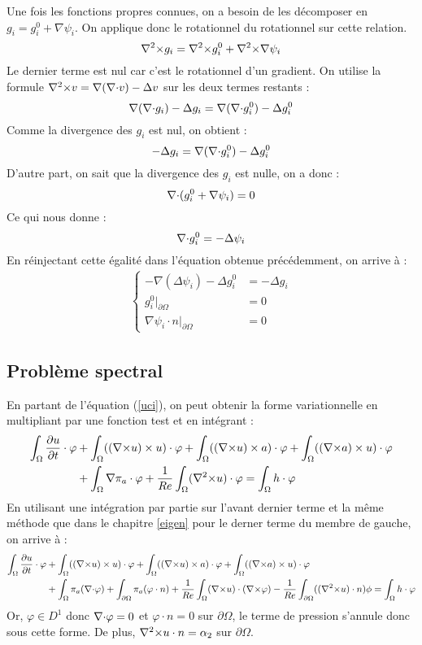 Une fois les fonctions propres connues, on a besoin de les décomposer en $g_i=g_i^0+\nabla\psi_i$. On applique donc le rotationnel du rotationnel sur cette relation.\\
\[
{\nabla^2\times} g_i = {\nabla^2\times} g_i^0 +{\nabla^2\times}\nabla\psi_i
\]
Le dernier terme est nul car c'est le rotationnel d'un gradient. On utilise la formule ${\nabla^2\times} v=\nabla({\nabla\cdot} v)-\Delta v$ sur les deux termes restants :
\[
\nabla({\nabla\cdot} g_i)-\Delta g_i = \nabla({\nabla\cdot} g_i^0)-\Delta g_i^0
\]
Comme la divergence des $g_i$ est nul, on obtient :
\[
-\Delta g_i = \nabla({\nabla\cdot} g_i^0)-\Delta g_i^0
\]
D'autre part, on sait que la divergence des $g_i$ est nulle, on a donc :
\[
{\nabla\cdot} (g_i^0+\nabla\psi_i)=0
\]
Ce qui nous donne :
\[
{\nabla\cdot} g_i^0=-\Delta\psi_i
\]
En réinjectant cette égalité dans l'équation obtenue précédemment, on arrive à :
\begin{eqnarray*}
\left\{
\begin{aligned}
-\nabla(\Delta\psi_i)-\Delta g_i^0 &= -\Delta g_i\\
g_i^0\big\rvert_{\partial\Omega} &= 0\\
\nabla\psi_i\cdot n\big\rvert_{\partial\Omega} &= 0
\end{aligned}
\right.
\end{eqnarray*}



\subsection{Problème spectral}
\label{spectre}

En partant de l'équation (\ref{uci}), on peut obtenir la forme variationnelle en multipliant par une fonction test et en intégrant :
\begin{align*}
\int_\Omega \frac{\partial u}{\partial t}\cdot \varphi &+ \int_\Omega (({\nabla\times} u)\times u)\cdot \varphi + \int_\Omega (({\nabla\times} u)\times a)\cdot\varphi + \int_\Omega (({\nabla\times} a)\times u)\cdot\varphi \\
&+ \int_\Omega \nabla\pi_a\cdot\varphi + \frac{1}{Re}\int_\Omega ({\nabla^2\times} u)\cdot\varphi = \int_\Omega h\cdot\varphi
\end{align*}
En utilisant une intégration par partie sur l'avant dernier terme et la même méthode que dans le chapitre \ref{eigen} pour le derner terme du membre de gauche, on arrive à :
\begin{align*}
\int_\Omega \frac{\partial u}{\partial t}\cdot \varphi &+ \int_\Omega (({\nabla\times} u)\times u)\cdot \varphi + \int_\Omega (({\nabla\times} u)\times a)\cdot\varphi + \int_\Omega (({\nabla\times} a)\times u)\cdot\varphi\\ 
&+ \int_\Omega \pi_a({\nabla\cdot}\varphi) + \int_{\partial \Omega} \pi_a(\varphi\cdot n) + \frac{1}{Re}\int_\Omega ({\nabla\times} u)\cdot({\nabla\times}\varphi) -\frac{1}{Re}\int_{\partial\Omega} (({\nabla^2\times} u)\cdot n)\phi = \int_\Omega h\cdot\varphi
\end{align*}
Or, $\varphi\in D^1$ donc ${\nabla\cdot}\varphi=0$ et $\varphi\cdot n=0$ sur $\partial\Omega$, le terme de pression s'annule donc sous cette forme. De plus, ${\nabla^2\times} u\cdot n=\alpha_2$ sur $\partial\Omega$.\\

